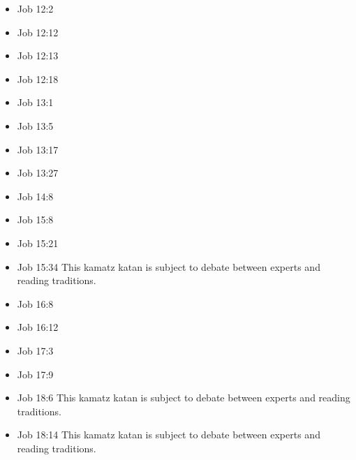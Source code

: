 \documentclass[14pt]{book}
\begin{document}
\begin{multicols}{2}
\begin{itemize}
											\item Job 12:2
											
											\item Job 12:12
											
											\item Job 12:13
											
											\item Job 12:18
											
											\item Job 13:1
											
											\item Job 13:5
											
											\item Job 13:17
											
											\item Job 13:27
											
											\item Job 14:8
											
											\item Job 15:8
											
											\item Job 15:21
											
											\item Job 15:34 This kamatz katan is subject to debate between experts and reading traditions.
											
											\item Job 16:8
													
													\item Job 16:12
													
													\item Job 17:3
													
													\item Job 17:9
															
															\item Job 18:6 This kamatz katan is subject to debate between experts and reading traditions.
															
															\item Job 18:14 This kamatz katan is subject to debate between experts and reading traditions.
															

\end{itemize}
\end{multicols}
\end{document}
